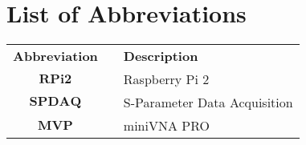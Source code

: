 
\chapter*{List of Abbreviations}

\begin{table}[h!]
	\begin{center}
		\begin{tabular}{c p{0.2cm} l}
			
			\multicolumn{1}{p{1in}}{\centering \textbf{Abbreviation}}	&&	\multicolumn{1}{p{5in}}{\textbf{Description}} \\[1mm]
			
			$\textbf{RPi2}$		&&	Raspberry Pi 2 \\[1mm]
			$\textbf{SPDAQ}$	&&	S-Parameter Data Acquisition \\[1mm]
			$\textbf{MVP}$		&&	miniVNA PRO \\[1mm]
			
		\end{tabular}
	\end{center}
\end{table}

